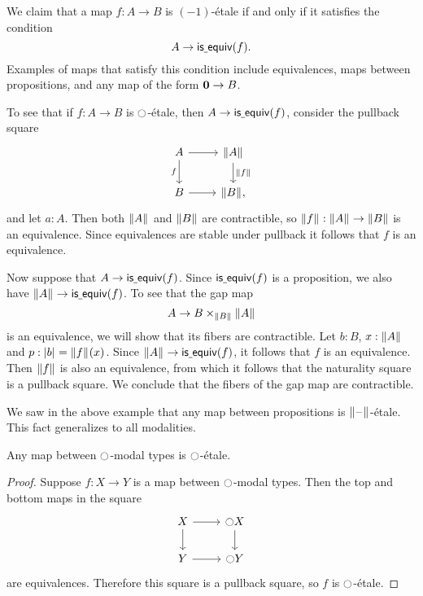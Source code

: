 \documentclass[9pt,twosided]{amsart}
\begin{document}
\begin{eg}\label{eg:etale_prop}
  We claim that a map $f:A\to B$ is $(-1)$-\'etale if and only if it satisfies the condition
  \begin{equation*}
    A\to \mathsf{is\underline{\ }{}equiv}(f).
  \end{equation*}
  Examples of maps that satisfy this condition include equivalences, maps between propositions, and any map of the form $\mathbf{0}\to B$.

To see that if $f:A\to B$ is ${\ocircle}$-\'etale, then $A\to\mathsf{is\underline{\ }{}equiv}(f)$, consider the pullback square
\begin{equation*}
\begin{tikzcd}
A \arrow[r] \arrow[d,swap,"f"] & \brck{A} \arrow[d,"\brck{f}"] \\
B \arrow[r] & \brck{B},
\end{tikzcd}
\end{equation*}
and let $a:A$. Then both $\brck{A}$ and $\brck{B}$ are contractible, so $\brck{f}:\brck{A}\to\brck{B}$ is an equivalence. Since equivalences are stable under pullback it follows that $f$ is an equivalence.

Now suppose that $A\to \mathsf{is\underline{\ }{}equiv}(f)$. Since $\mathsf{is\underline{\ }{}equiv}(f)$ is a proposition, we also have $\brck{A}\to\isequiv(f)$. To see that the gap map
\begin{equation*}
A \to B\times_{\brck{B}}\brck{A}
\end{equation*}
is an equivalence, we will show that its fibers are contractible. Let $b:B$, $x:\brck{A}$ and $p:\bproj{b}=\brck{f}(x)$. Since $\brck{A}\to\isequiv(f)$, it follows that $f$ is an equivalence. Then $\brck{f}$ is also an equivalence, from which it follows that the naturality square is a pullback square. We conclude that the fibers of the gap map are contractible. 
\end{eg}

We saw in the above example that any map between propositions is $\brck{\blank}$-\'etale. This fact generalizes to all modalities.

\begin{lem}\label{lem:etale_modal}
Any map between ${\ocircle}$-modal types is ${\ocircle}$-\'etale.
\end{lem}

\begin{proof}
Suppose $f:X\to Y$ is a map between ${\ocircle}$-modal types. Then the top and bottom maps in the square
\begin{equation*}
\begin{tikzcd}
X \arrow[r] \arrow[d] & \modal X \arrow[d] \\
Y \arrow[r] & \modal Y
\end{tikzcd}
\end{equation*}
are equivalences. Therefore this square is a pullback square, so $f$ is ${\ocircle}$-\'etale.
\end{proof}
\end{document}
